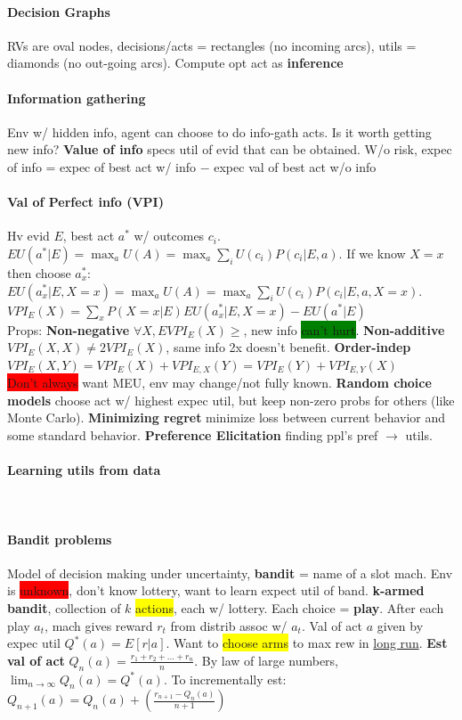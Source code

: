 \paragraph{Decision Graphs} RVs are oval nodes, decisions/acts =
rectangles (no incoming arcs), utils = diamonds (no out-going
arcs). Compute opt act as \textbf{inference}
\paragraph{Information gathering} Env w/ hidden info, agent can choose
to do info-gath acts. Is it worth getting new info? \textbf{Value of
  info} specs util of evid that can be obtained. W/o risk, expec of
info = expec of best act w/ info $-$ expec val of best act w/o info
\paragraph{Val of Perfect info (VPI)} Hv evid $E$, best act $a^*$ w/
outcomes $c_i$. $EU(a^*|E) = \max_a U(A) = \max_a \sum_i
U(c_i)P(c_i|E,a)$. If we know $X=x$ then choose $a_x^*$: $EU(a^*_x|E, X=x) = \max_a U(A) = \max_a \sum_i
U(c_i)P(c_i|E,a, X=x)$. $VPI_E(X) = \sum_x P(X=x|E)EU(a^*_x|E,X=x) -
EU(a^*|E)$ 
\\ Props: \textbf{Non-negative} $\forall X,E VPI_E(X)\geq$, new info
\colorbox{green}{can't hurt}. \textbf{Non-additive} $VPI_E(X,X) \neq
2VPI_E(X)$, same info 2x doesn't benefit. \textbf{Order-indep}
$VPI_E(X,Y) = VPI_E(X)+VPI_{E,X}(Y) = VPI_E(Y) + VPI_{E,Y}(X)$
\\ \colorbox{red}{Don't always} want MEU, env may change/not fully
known. \textbf{Random choice models} choose act w/ highest expec util,
but keep non-zero probs for others (like Monte
Carlo). \textbf{Minimizing regret} minimize loss between current
behavior and some standard behavior. \textbf{Preference Elicitation}
finding ppl's pref $\to$ utils.
\paragraph{Learning utils from data}~
\paragraph{Bandit problems} Model of decision making under
uncertainty, \textbf{bandit} = name of a slot mach. Env is
\colorbox{red}{unknown}, don't know lottery, want to learn expect util
of band. \textbf{k-armed bandit}, collection of $k$
\colorbox{yellow}{actions}, each w/ lottery. Each choice =
\textbf{play}. After each play $a_t$, mach gives reward $r_t$ from
distrib assoc w/ $a_t$. Val of act $a$ given by expec util
$Q^*(a)=E[r|a]$. Want to \colorbox{yellow}{choose arms} to max rew in
\underline{long run}. \textbf{Est val of act}
$Q_n(a)=\frac{r_1+r_2+\ldots+r_n}{n}$. By law of large numbers,
$\lim_{n\to\infty}Q_n(a)=Q^*(a)$. To incrementally est:
$Q_{n+1}(a)=Q_n(a)+ \left(\frac{r_{n+1}-Q_n(a)}{n+1}\right)$
